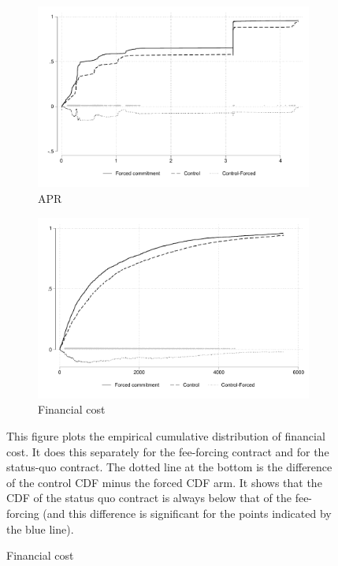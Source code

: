 \vspace{.2in}
\begin{figure}[H]
        \caption{Empirical CDF of Financial Cost: Forced commitment vs Control}
    \label{ecdf_fc}
    
    \begin{center}
       \begin{subfigure}{0.49\textwidth}
        \caption{APR}
        \centering
        \includegraphics[width=\textwidth]{Figuras/cdf_apr.pdf}
    \end{subfigure} 
   \begin{subfigure}{0.49\textwidth}
        \caption{Financial cost}
        \centering
        \includegraphics[width=\textwidth]{Figuras/cdf_fc_admin.pdf}
    \end{subfigure} 
    \end{center}
    \scriptsize This figure plots the empirical cumulative distribution of financial cost. It does this separately for the fee-forcing contract and for the status-quo contract. The dotted line at the bottom is the difference of the control CDF minus the forced CDF arm. It shows that the CDF of the status quo contract is always below that of the fee-forcing (and this difference is significant for the points indicated by the blue line).
\end{figure}


